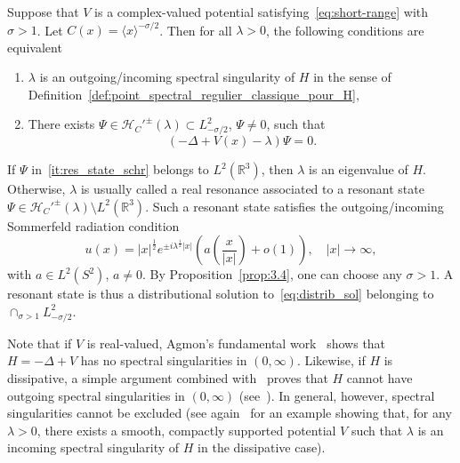 \documentclass[10pt]{amsart}
\theoremstyle{definition}\newtheorem{defi}[theo]{Definition}\newtheorem{rema}[theo]{Remark}\newtheorem{exam}[theo]{Example}\newtheorem{exem}[theo]{Example}\newtheorem{nota}[theo]{Notation}
\newcommand{\Hi}{\mathcal{H}}
\newcommand{\R}{\mathbb{R}}
\newcommand*{\romanenumi}{\renewcommand*{\theenumi}{\roman{enumi}}}
\begin{document}
\begin{prop}\label{prop:3.4}
Suppose that $V$ is a complex-valued potential satisfying~\eqref{eq:short-range} with $\sigma>1$. Let $C(x)=\langle x\rangle^{-\sigma/2}$. Then for all $\lambda>0$, the following conditions are equivalent
\begin{enumerate}\romanenumi
\item\label{it:spec_sing_schr}
$\lambda$ is an outgoing/incoming spectral singularity of $H$ in the sense of Definition~\ref{def:point_spectral_regulier_classique_pour_H},
\item\label{it:res_state_schr}
There exists $\Psi\in\Hi_C'^\pm(\lambda) \subset L^2_{-\sigma/2}$, $\Psi\neq0$, such that
\begin{equation}\label{eq:distrib_sol}
(-\Delta+V(x)-\lambda)\Psi=0.
\end{equation}
\end{enumerate}
\end{prop}

If $\Psi$ in~\eqref{it:res_state_schr} belongs to $L^2(\R^3)$, then $\lambda$ is an eigenvalue of $H$. Otherwise, $\lambda$ is usually called a real resonance associated to a resonant state $\Psi\in\Hi_C'^\pm(\lambda)\setminus L^2(\R^3)$. Such a resonant state satisfies the outgoing/incoming Sommerfeld radiation condition
\begin{equation*}
u(x)=|x|^{\frac12 } e^{\pm i \lambda^{\frac12} | x |} \left (a \left(\frac{x}{|x|}\right) + o(1) \right), \quad |x| \to \infty,
\end{equation*}
with $a \in L^2(S^2)$, $a\neq 0$. By Proposition~\ref{prop:3.4}, one can choose any $\sigma>1$. A resonant state is thus a distributional solution to~\eqref{eq:distrib_sol} belonging to $\cap_{\sigma>1}L^2_{-\sigma/2}$.

Note that if $V$ is real-valued, Agmon's fundamental work~\cite{Ag75_01} shows that $H=-\Delta+V$ has no spectral singularities in $(0,\infty)$. Likewise, if $H$ is dissipative, a simple argument combined with~\cite{Ag75_01} proves that $H$ cannot have outgoing spectral singularities in $(0,\infty)$ (see~\cite{Wa12_01}). In general, however, spectral singularities cannot be excluded (see again~\cite{Wa12_01} for an example showing that, for any $\lambda>0$, there exists a smooth, compactly supported potential $V$ such that $\lambda$ is an incoming spectral singularity of $H$ in the dissipative case).
\end{document}
